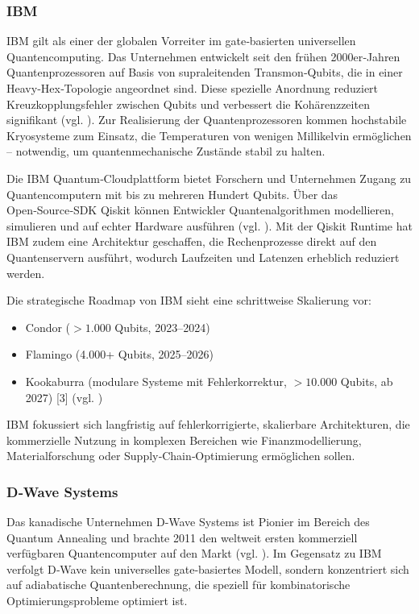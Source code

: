 \subsubsection*{IBM}
IBM gilt als einer der globalen Vorreiter im gate‑basierten universellen Quantencomputing.
Das Unternehmen entwickelt seit den frühen 2000er‑Jahren Quantenprozessoren auf Basis von supraleitenden Transmon‑Qubits, die in einer Heavy‑Hex‑Topologie angeordnet sind.
Diese spezielle Anordnung reduziert Kreuzkopplungsfehler zwischen Qubits und verbessert die Kohärenzzeiten signifikant  (vgl. \cite{noauthor_ibm_nodate-1}).
Zur Realisierung der Quantenprozessoren kommen hochstabile Kryosysteme zum Einsatz, die Temperaturen von wenigen Millikelvin ermöglichen – notwendig, um quantenmechanische Zustände stabil zu halten.

Die IBM Quantum‑Cloudplattform bietet Forschern und Unternehmen Zugang zu Quantencomputern mit bis zu mehreren Hundert Qubits.
Über das Open‑Source‑SDK Qiskit können Entwickler Quantenalgorithmen modellieren, simulieren und auf echter Hardware ausführen (vgl. \cite{noauthor_ibm_nodate}).
Mit der Qiskit Runtime hat IBM zudem eine Architektur geschaffen, die Rechenprozesse direkt auf den Quantenservern ausführt, wodurch Laufzeiten und Latenzen erheblich reduziert werden.

Die strategische Roadmap von IBM sieht eine schrittweise Skalierung vor:
\begin{itemize}
\item Condor ($>1.000$ Qubits, 2023–2024)
\item Flamingo (4.000+ Qubits, 2025–2026)
\item Kookaburra (modulare Systeme mit Fehlerkorrektur, $>10.000$ Qubits, ab 2027) [3] (vgl. \cite{noauthor_httpswwwibmcomroadmapsquantum_nodate})
\end{itemize}
IBM fokussiert sich langfristig auf fehlerkorrigierte, skalierbare Architekturen, die kommerzielle Nutzung in komplexen Bereichen wie Finanzmodellierung, Materialforschung oder Supply‑Chain‑Optimierung ermöglichen sollen.

\subsubsection*{D‑Wave Systems}
Das kanadische Unternehmen D‑Wave Systems ist Pionier im Bereich des Quantum Annealing und brachte 2011 den weltweit ersten kommerziell verfügbaren Quantencomputer auf den Markt (vgl. \cite{noauthor_d-wave_nodate-2}).
Im Gegensatz zu IBM verfolgt D‑Wave kein universelles gate‑basiertes Modell, sondern konzentriert sich auf adiabatische Quantenberechnung, die speziell für kombinatorische Optimierungsprobleme optimiert ist.

